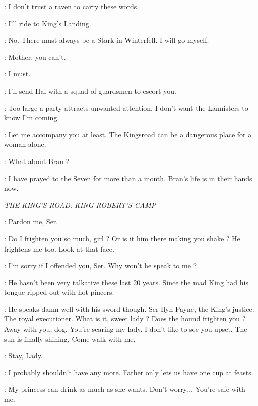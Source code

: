 \CATELYN: I don't trust a raven to carry these words. 

\ROBB: I'll ride to King's Landing. 

\CATELYN: No. There must always be a Stark in Winterfell. I will go myself. 

\ROBB: Mother, you can't. 

\CATELYN: I must. 

\RODRIK: I'll send Hal with a squad of guardsmen to escort you. 

\CATELYN: Too large a party attracts unwanted attention. I don't want the Lannisters to know I'm coming. 

\RODRIK: Let me accompany you at least. The Kingsroad can be a dangerous place for a woman alone. 

\ROBB: What about Bran ? 

\CATELYN: I have prayed to the Seven for more than a month. Bran's life is in their hands now. 


\scene

\textit{THE KING'S ROAD: KING ROBERT'S CAMP} 


\SANSA: Pardon me, Ser. 


\HOUND: Do I frighten you so much, girl ? Or is it him there making you shake ? He frightens me too. Look at that face. 

\SANSA:  I'm sorry if I offended you, Ser.  Why won't he speak to me ? 

\HOUND: He hasn't been very talkative these last 20 years. Since the mad King had his tongue ripped out with hot pincers. 

\JOFFREY: He speaks damn well with his sword though. Ser Ilyn Payne, the King's justice. The royal executioner. What is it, sweet lady ? Does the hound frighten you ? Away with you, dog. You're scaring my lady. I don't like to see you upset. The sun is finally shining. Come walk with me. 

\SANSA: Stay, Lady. 


\SANSA: I probably shouldn't have any more. Father only lets us have one cup at feasts. 

\JOFFREY: My princess can drink as much as she wants. Don't worry$\ldots$ You're safe with me. 

